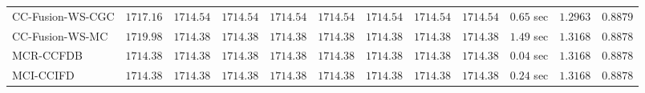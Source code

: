 \begin{table}[H]
\begin{tabular}{lrrrrrrrrrrr}
    CC-Fusion-WS-CGC & $      1717.16$ & $      1714.54$ & $      1714.54$ & $      1714.54$ & $      1714.54$ & $      1714.54$ & $      1714.54$ & $      1714.54$ & $         0.65$ sec    & $       1.2963$  & $       0.8879$ \\ 
     CC-Fusion-WS-MC & $      1719.98$ & $      1714.38$ & $      1714.38$ & $      1714.38$ & $      1714.38$ & $      1714.38$ & $      1714.38$ & $      1714.38$ & $         1.49$ sec    & $       1.3168$  & $       0.8878$ \\ 
\cmidrule{1-1} 
           MCR-CCFDB & $      1714.38$ & $      1714.38$ & $      1714.38$ & $      1714.38$ & $      1714.38$ & $      1714.38$ & $      1714.38$ & $      1714.38$ & $         0.04$ sec    & $       1.3168$  & $       0.8878$ \\ 
\cmidrule{1-1} 
           MCI-CCIFD & $      1714.38$ & $      1714.38$ & $      1714.38$ & $      1714.38$ & $      1714.38$ & $      1714.38$ & $      1714.38$ & $      1714.38$ & $         0.24$ sec    & $       1.3168$  & $       0.8878$ \\ 
\bottomrule
\end{tabular}
\end{table}

